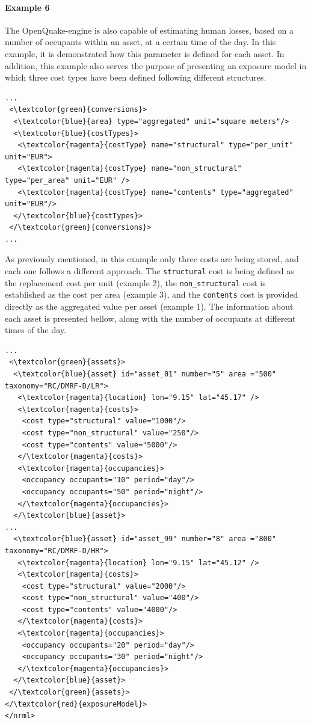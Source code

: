 \paragraph{Example 6}
The OpenQuake-engine is also capable of estimating human losses, based on a number of occupants within an asset, at a certain time of the day. In this example, it is demonstrated how this parameter is defined for each asset. In addition, this example also serves the purpose of presenting an \gls{exposure model} in which three cost types have been defined following different structures.

\begin{Verbatim}[frame=single, commandchars=\\\{\}, samepage=false]
...
 <\textcolor{green}{conversions}>
  <\textcolor{blue}{area} type="aggregated" unit="square meters"/>
  <\textcolor{blue}{costTypes}>
   <\textcolor{magenta}{costType} name="structural" type="per_unit" unit="EUR">
   <\textcolor{magenta}{costType} name="non_structural" type="per_area" unit="EUR" />
   <\textcolor{magenta}{costType} name="contents" type="aggregated" unit="EUR"/>
  </\textcolor{blue}{costTypes}>
 </\textcolor{green}{conversions}>
...
\end{Verbatim}

As previously mentioned, in this example only three costs are being stored, and each one follows a different approach. The \Verb+structural+ cost is being defined as the replacement cost per unit (example 2), the \Verb+non_structural+ cost is established as the cost per area (example 3), and the \Verb+contents+ cost is provided directly as the aggregated value per asset (example 1). The information about each asset is presented bellow, along with the number of occupants at different times of the day.

\begin{Verbatim}[frame=single, commandchars=\\\{\}, samepage=false]
...
 <\textcolor{green}{assets}>
  <\textcolor{blue}{asset} id="asset_01" number="5" area ="500" taxonomy="RC/DMRF-D/LR">
   <\textcolor{magenta}{location} lon="9.15" lat="45.17" />
   <\textcolor{magenta}{costs}>
    <cost type="structural" value="1000"/>
    <cost type="non_structural" value="250"/>
    <cost type="contents" value="5000"/>
   </\textcolor{magenta}{costs}>
   <\textcolor{magenta}{occupancies}>
    <occupancy occupants="10" period="day"/>
    <occupancy occupants="50" period="night"/>
   </\textcolor{magenta}{occupancies}>
  </\textcolor{blue}{asset}>
...
  <\textcolor{blue}{asset} id="asset_99" number="8" area ="800" taxonomy="RC/DMRF-D/HR">
   <\textcolor{magenta}{location} lon="9.15" lat="45.12" />
   <\textcolor{magenta}{costs}>
    <cost type="structural" value="2000"/>
    <cost type="non_structural" value="400"/>
    <cost type="contents" value="4000"/>
   </\textcolor{magenta}{costs}>
   <\textcolor{magenta}{occupancies}>
    <occupancy occupants="20" period="day"/>
    <occupancy occupants="30" period="night"/>
   </\textcolor{magenta}{occupancies}>
  </\textcolor{blue}{asset}>
 </\textcolor{green}{assets}>
</\textcolor{red}{exposureModel}>
</nrml>
\end{Verbatim}

